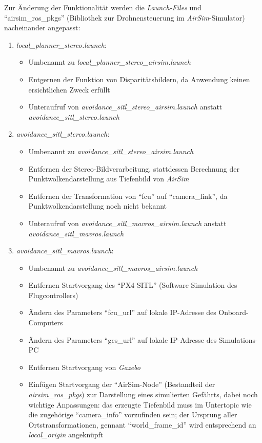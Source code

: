 Zur Änderung der Funktionalität werden die \textit{Launch-Files} und \enquote{airsim\_ros\_pkgs} (Bibliothek zur Drohnensteuerung im \textit{AirSim}-Simulator) nacheinander angepasst:
\begin{enumerate}
    \item \textit{local\_planner\_stereo.launch}:
    \begin{itemize}
        \item Umbenannt zu \textit{local\_planner\_stereo\_airsim.launch}
        \item Entgernen der Funktion von Disparitätsbildern, da Anwendung keinen ersichtlichen Zweck erfüllt
        \item Unteraufruf von \textit{avoidance\_sitl\_stereo\_airsim.launch} anstatt \textit{avoidance\_sitl\_stereo.launch}
    \end{itemize}
    \item \textit{avoidance\_sitl\_stereo.launch}:
    \begin{itemize}
        \item Umbenannt zu \textit{avoidance\_sitl\_stereo\_airsim.launch}
        \item Entfernen der Stereo-Bildverarbeitung, stattdessen Berechnung der Punktwolkendarstellung aus Tiefenbild von \textit{AirSim}
        \item Entfernen der Transformation von \enquote{fcu} auf \enquote{camera\_link}, da Punktwolkendarstellung noch nicht bekannt
        \item Unteraufruf von \textit{avoidance\_sitl\_mavros\_airsim.launch} anstatt \textit{avoidance\_sitl\_mavros.launch}
    \end{itemize}
    \item \textit{avoidance\_sitl\_mavros.launch}:
    \begin{itemize}
        \item Umbenannt zu \textit{avoidance\_sitl\_mavros\_airsim.launch}
        \item Entfernen Startvorgang des \enquote{PX4 SITL} (Software Simulation des Flugcontrollers)
        \item Ändern des Parameters \enquote{fcu\_url} auf lokale IP-Adresse des Onboard-Computers
        \item Ändern des Parameters \enquote{gcs\_url} auf lokale IP-Adresse des Simulations-PC
        \item Entfernen Startvorgang von \textit{Gazebo}
        \item Einfügen Startvorgang der \enquote{AirSim-Node} (Bestandteil der \textit{airsim\_ros\_pkgs}) zur Darstellung eines simulierten Gefährts, dabei noch wichtige Anpassungen: das erzeugte Tiefenbild muss im Untertopic wie die zugehörige \enquote{camera\_info} vorzufinden sein; der Ursprung aller Ortstransformationen, gennant \enquote{world\_frame\_id} wird entsprechend an \textit{local\_origin} angeknüpft

\end{itemize}
\end{enumerate}
